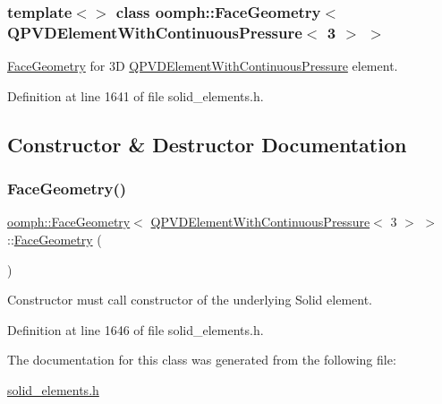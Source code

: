 \subsubsection*{template$<$$>$\newline
class oomph\+::\+Face\+Geometry$<$ Q\+P\+V\+D\+Element\+With\+Continuous\+Pressure$<$ 3 $>$ $>$}

\hyperlink{classoomph_1_1FaceGeometry}{Face\+Geometry} for 3D \hyperlink{classoomph_1_1QPVDElementWithContinuousPressure}{Q\+P\+V\+D\+Element\+With\+Continuous\+Pressure} element. 

Definition at line 1641 of file solid\+\_\+elements.\+h.



\subsection{Constructor \& Destructor Documentation}
\mbox{\label{classoomph_1_1FaceGeometry_3_01QPVDElementWithContinuousPressure_3_013_01_4_01_4_aeab2d09c7a96416e52aae28818b1c0c4}} 
\subsubsection{\texorpdfstring{Face\+Geometry()}{FaceGeometry()}}
{\footnotesize\ttfamily \hyperlink{classoomph_1_1FaceGeometry}{oomph\+::\+Face\+Geometry}$<$ \hyperlink{classoomph_1_1QPVDElementWithContinuousPressure}{Q\+P\+V\+D\+Element\+With\+Continuous\+Pressure}$<$ 3 $>$ $>$\+::\hyperlink{classoomph_1_1FaceGeometry}{Face\+Geometry} (\begin{DoxyParamCaption}{ }\end{DoxyParamCaption})\hspace{0.3cm}{\ttfamily [inline]}}



Constructor must call constructor of the underlying Solid element. 



Definition at line 1646 of file solid\+\_\+elements.\+h.



The documentation for this class was generated from the following file\+:\begin{DoxyCompactItemize}
\item 
\hyperlink{solid__elements_8h}{solid\+\_\+elements.\+h}\end{DoxyCompactItemize}

